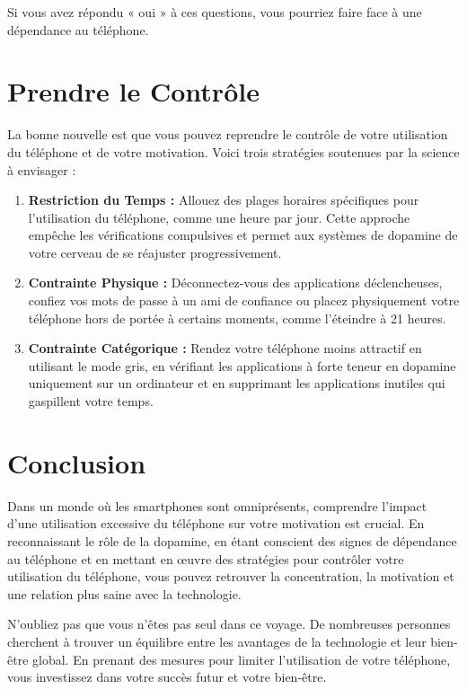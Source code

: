 \documentclass[a4paper, 10pt, garamond]{book}
\begin{document}
Si vous avez répondu « oui » à ces questions, vous pourriez faire face à une
dépendance au téléphone.

\section{Prendre le Contrôle}

La bonne nouvelle est que vous pouvez reprendre le contrôle de votre utilisation
du téléphone et de votre motivation. Voici trois stratégies soutenues par la
science à envisager :
\begin{enumerate}
	\item \textbf{Restriction du Temps :} Allouez des plages horaires spécifiques
	      pour l'utilisation du téléphone, comme une heure par jour. Cette
	      approche empêche les vérifications compulsives et permet aux systèmes de
	      dopamine de votre cerveau de se réajuster progressivement.
	\item \textbf{Contrainte Physique :} Déconnectez-vous des applications
	      déclencheuses, confiez vos mots de passe à un ami de confiance ou placez
	      physiquement votre téléphone hors de portée à certains moments, comme
	      l'éteindre à 21 heures.
	\item \textbf{Contrainte Catégorique :} Rendez votre téléphone moins attractif
	      en utilisant le mode gris, en vérifiant les applications à forte teneur en
	      dopamine uniquement sur un ordinateur et en supprimant les applications
	      inutiles qui gaspillent votre temps.
\end{enumerate}

\section{Conclusion}

Dans un monde où les smartphones sont omniprésents, comprendre l'impact d'une
utilisation excessive du téléphone sur votre motivation est crucial. En
reconnaissant le rôle de la dopamine, en étant conscient des signes de
dépendance au téléphone et en mettant en œuvre des stratégies pour contrôler
votre utilisation du téléphone, vous pouvez retrouver la concentration, la
motivation et une relation plus saine avec la technologie.

N'oubliez pas que vous n'êtes pas seul dans ce voyage. De nombreuses personnes
cherchent à trouver un équilibre entre les avantages de la technologie et leur
bien-être global. En prenant des mesures pour limiter l'utilisation de votre
téléphone, vous investissez dans votre succès futur et votre bien-être.
\end{document}
